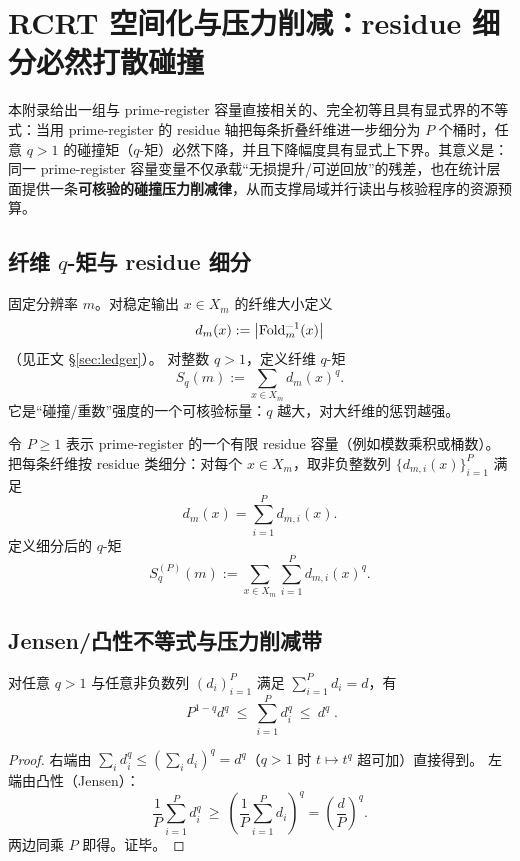 \section{RCRT 空间化与压力削减：residue 细分必然打散碰撞}\label{app:rcrt-pressure-reduction}

本附录给出一组与 prime-register 容量直接相关的、完全初等且具有显式界的不等式：当用 prime-register 的 residue 轴把每条折叠纤维进一步细分为 \(P\) 个桶时，任意 \(q>1\) 的碰撞矩（\(q\)-矩）必然下降，并且下降幅度具有显式上下界。其意义是：同一 prime-register 容量变量不仅承载“无损提升/可逆回放”的残差，也在统计层面提供一条\textbf{可核验的碰撞压力削减律}，从而支撑局域并行读出与核验程序的资源预算。

\subsection{纤维 \texorpdfstring{$q$}{q}-矩与 residue 细分}\label{subsec:rcrt-moment-def}
固定分辨率 \(m\)。对稳定输出 \(x\in X_m\) 的纤维大小定义
$$
d_m(x):=\left\lvert \mathrm{Fold}_m^{-1}(x)\right\rvert
$$
（见正文 \S\ref{sec:ledger}）。
对整数 \(q>1\)，定义纤维 \(q\)-矩
$$
S_q(m):=\sum_{x\in X_m} d_m(x)^q.
$$
它是“碰撞/重数”强度的一个可核验标量：\(q\) 越大，对大纤维的惩罚越强。

令 \(P\ge 1\) 表示 prime-register 的一个有限 residue 容量（例如模数乘积或桶数）。
把每条纤维按 residue 类细分：对每个 \(x\in X_m\)，取非负整数列 \(\{d_{m,i}(x)\}_{i=1}^{P}\) 满足
$$
d_m(x)=\sum_{i=1}^{P} d_{m,i}(x).
$$
定义细分后的 \(q\)-矩
$$
S_q^{(P)}(m):=\sum_{x\in X_m}\sum_{i=1}^{P} d_{m,i}(x)^q.
$$

\subsection{Jensen/凸性不等式与压力削减带}\label{subsec:rcrt-pressure-law}

\begin{lemma}\label{lem:rcrt-jensen}
对任意 \(q>1\) 与任意非负数列 \((d_i)_{i=1}^{P}\) 满足 \(\sum_{i=1}^{P}d_i=d\)，有
$$
\boxed{\;
P^{1-q}d^q\ \le\ \sum_{i=1}^{P}d_i^q\ \le\ d^q\; }.
$$
\end{lemma}
\begin{proof}
右端由 \(\sum_i d_i^q\le (\sum_i d_i)^q=d^q\)（\(q>1\) 时 \(t\mapsto t^q\) 超可加）直接得到。
左端由凸性（Jensen）：
$$
\frac{1}{P}\sum_{i=1}^{P} d_i^q\ \ge\ \left(\frac{1}{P}\sum_{i=1}^{P}d_i\right)^{\!q}
=\left(\frac{d}{P}\right)^{\!q}.
$$
两边同乘 \(P\) 即得。证毕。
\end{proof}

